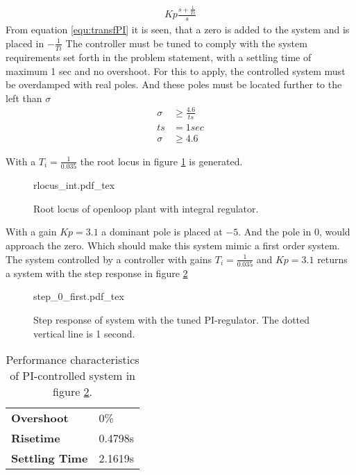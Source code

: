 \documentclass[../../../Main]{subfiles}
\begin{document}
\begin{align}
	Kp \frac{s+\frac{1}{Ti}}{s}
	\label{equ:transfPI}
\end{align}
From equation \eqref{equ:transfPI} it is seen, that a zero is added to the system and is placed in $-\frac{1}{Ti} $
The controller must be tuned to comply with the system requirements set forth in the problem statement, with a settling time of maximum 1 sec and no overshoot. For this to apply, the controlled system must be overdamped with real poles. And these poles must be located further to the left than $\sigma$
\begin{align}
	\sigma &\ge \frac{4.6}{ts}\\
	ts &= 1 sec\\
	\sigma &\ge 4.6
\end{align}

With a $T_i = \frac{1}{0.035}$ the root locus in figure \ref{fig:rlocus_int} is generated.

\begin{figure}[H]
\centering
\def\svgwidth{\textwidth}
{rlocus_int.pdf_tex}
\caption{Root locus of openloop plant with integral regulator.}
\label{fig:rlocus_int}
\end{figure}

With a gain $Kp = 3.1$ a dominant pole is placed at $-5$. And the pole in 0, would approach the zero. Which should make this system mimic a first order system. The system controlled by a controller with gains $T_i = \frac{1}{0.035}$ and $Kp = 3.1$ returns a system with the step response in figure \ref{fig:step_0_first}

\begin{figure}[H]
\centering
\def\svgwidth{\textwidth}
{step_0_first.pdf_tex}
\caption{Step response of system with the tuned PI-regulator. The dotted vertical line is 1 second.}
\label{fig:step_0_first}
\end{figure}

\begin{table}[h]
	 \centering
	 \begin{tabular}{ll}
		\textbf{Overshoot} & 0\%\\
		 \textbf{Risetime} & 0.4798s\\
		 \textbf{Settling Time} & 2.1619s
	 \end{tabular}
	 \caption{Performance characteristics of PI-controlled system in figure \ref{fig:step_0_first}.}
	 \label{tab:performance_0_1}
\end{table}
\end{document}

